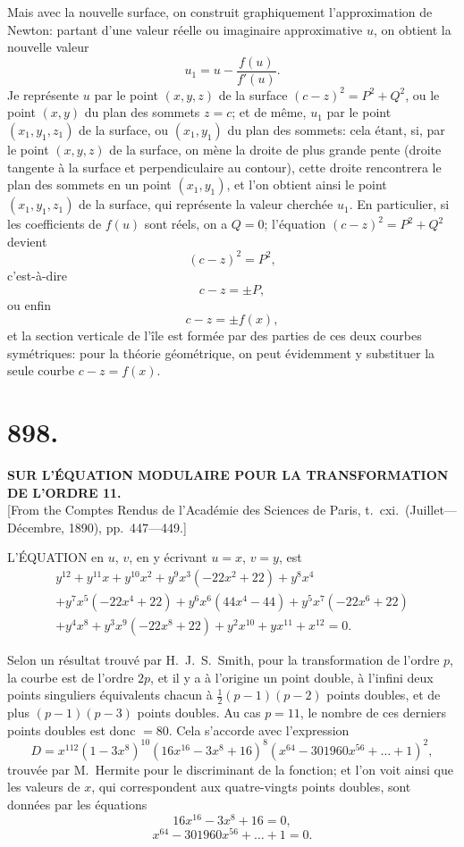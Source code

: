 \documentclass[11pt,a4paper]{article}
\begin{document}
Mais avec la nouvelle surface, on construit graphiquement l'approximation de Newton: partant d'une valeur r\'eelle ou imaginaire approximative $u$, on obtient la nouvelle valeur
\[
u_1 = u - \frac{f(u)}{f'(u)}.
\]
Je repr\'esente $u$ par le point $(x, y, z)$ de la surface $(c - z)^2 = P^2 + Q^2$, ou le point $(x, y)$ du plan des sommets $z = c$; et de m\^eme, $u_1$ par le point $(x_1, y_1, z_1)$ de la surface, ou $(x_1, y_1)$ du plan des sommets: cela \'etant, si, par le point $(x, y, z)$ de la surface, on m\`ene la droite de plus grande pente (droite tangente \`a la surface et perpendiculaire au contour), cette droite rencontrera le plan des sommets en un point $(x_1, y_1)$, et l'on obtient ainsi le point $(x_1, y_1, z_1)$ de la surface, qui repr\'esente la valeur cherch\'ee $u_1$. En particulier, si les coefficients de $f(u)$ sont r\'eels, on a $Q = 0$; l'\'equation $(c - z)^2 = P^2 + Q^2$ devient
\[
(c-z)^2 = P^2,
\]
c'est-\`a-dire
\[
c - z = \pm P,
\]
ou enfin
\[
c - z = \pm f(x),
\]
et la section verticale de l'\^ile est form\'ee par des parties de ces deux courbes sym\'etriques: pour la th\'eorie g\'eom\'etrique, on peut \'evidemment y substituer la seule courbe $c - z = f(x)$.


\section*{898.}
\begin{center}
{\large\bfseries SUR L'\'EQUATION MODULAIRE POUR LA TRANSFORMATION DE L'ORDRE 11.}\\[0.5em]
\small [From the Comptes Rendus de l'Acad\'emie des Sciences de Paris, t.\ cxi.\ (Juillet---D\'ecembre, 1890), pp.\ 447---449.]
\end{center}

L'\'EQUATION en $u$, $v$, en y \'ecrivant $u = x$, $v = y$, est
\begin{multline*}
y^{12} + y^{11}x + y^{10}x^2 + y^9x^3(-22x^2 + 22) + y^8x^4 \\
+ y^7x^5(-22x^4 + 22) + y^6x^6(44x^4 - 44) + y^5x^7(-22x^6 + 22) \\
+ y^4x^8 + y^3x^9(-22x^8 + 22) + y^2x^{10} + yx^{11} + x^{12} = 0.
\end{multline*}

Selon un r\'esultat trouv\'e par H.\ J.\ S.\ Smith, pour la transformation de l'ordre $p$, la courbe est de l'ordre $2p$, et il y a \`a l'origine un point double, \`a l'infini deux points singuliers \'equivalents chacun \`a $\tfrac{1}{2}(p-1)(p-2)$ points doubles, et de plus $(p-1)(p-3)$ points doubles. Au cas $p = 11$, le nombre de ces derniers points doubles est donc $= 80$. Cela s'accorde avec l'expression
\[
D = x^{112}(1 - 3x^8)^{10}(16x^{16} - 3x^8 + 16)^8(x^{64} - 301960x^{56} + \ldots + 1)^2,
\]
trouv\'ee par M.\ Hermite pour le discriminant de la fonction; et l'on voit ainsi que les valeurs de $x$, qui correspondent aux quatre-vingts points doubles, sont donn\'ees par les \'equations
\[
16x^{16} - 3x^8 + 16 = 0,
\]
\[
x^{64} - 301960x^{56} + \ldots + 1 = 0.
\]
\end{document}
